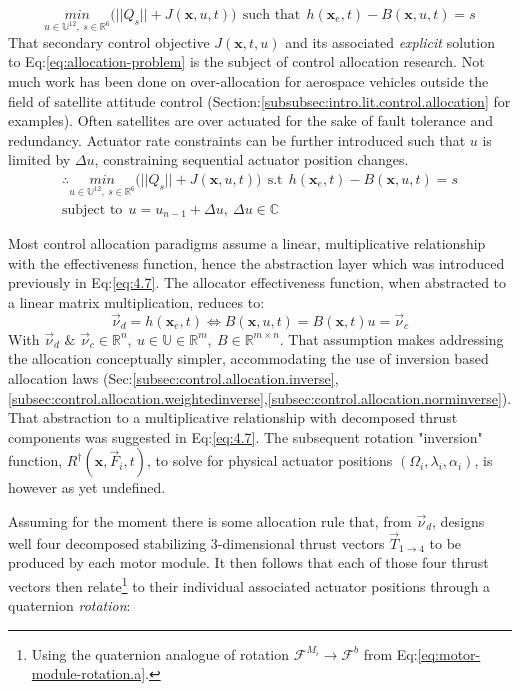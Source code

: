 \begin{equation}\label{eq:allocation-problem}
\underset{u\in\mathbb{U}^{12},~s\in\mathbb{R}^{6}}{min}\big(||Q_s||+J(\mathbf{x},u,t)\big)~~\text{such that}~~h(\mathbf{x}_e,t)-B(\mathbf{x},u,t)=s
\end{equation}
That secondary control objective $J(\mathbf{x},t,u)$ and its associated \emph{explicit} solution to Eq:\ref{eq:allocation-problem} is the subject of control allocation research. Not much work has been done on over-allocation for aerospace vehicles outside the field of satellite attitude control (Section:\ref{subsubsec:intro.lit.control.allocation} for examples). Often satellites are over actuated for the sake of fault tolerance and redundancy\cite{FTCallocation,discreteFTC}. Actuator rate constraints can be further introduced such that $u$ is limited by $\Delta u$, constraining sequential actuator position changes.
\begin{multline}
\therefore\underset{u\in\mathbb{U}^{12},~s\in\mathbb{R}^6}{min}\big(||Q_s||+J(\mathbf{x},u,t)\big)~~\text{s.t}~~h(\mathbf{x}_e,t)-B(\mathbf{x},u,t)=s\\\text{subject to}~~u=u_{n-1}+\Delta u,~\Delta u\in\mathbb{C}
\end{multline}
\par
Most control allocation paradigms assume a linear, multiplicative relationship with the effectiveness function, hence the abstraction layer which was introduced previously in Eq:\ref{eq:4.7}. The allocator effectiveness function, when abstracted to a linear matrix multiplication, reduces to:
\begin{equation}
\vec{\nu}_d=h(\mathbf{x}_e,t)\Longleftrightarrow B(\mathbf{x},u,t)=B(\mathbf{x},t)u=\vec{\nu}_c
\end{equation}
With $\vec{\nu}_d\text{~\&~}\vec{\nu}_c\in\mathbb{R}^n,~u\in\mathbb{U}\in\mathbb{R}^m,~B\in\mathbb{R}^{m\times n}$. That assumption makes addressing the allocation conceptually simpler, accommodating the use of inversion based allocation laws (Sec:\ref{subsec:control.allocation.inverse},\ref{subsec:control.allocation.weightedinverse},\ref{subsec:control.allocation.norminverse}). That abstraction to a multiplicative relationship with decomposed thrust components was suggested in Eq:\ref{eq:4.7}. The subsequent rotation "inversion" function, $R^\dagger(\mathbf{x},\vec{F}_i,t)$, to solve for physical actuator positions $(\Omega_i,\lambda_i,\alpha_i)$, is however as yet undefined.
\par
Assuming for the moment there is some allocation rule that, from $\vec{\nu}_d$, designs well four decomposed stabilizing 3-dimensional thrust vectors $\vec{T}_{1\rightarrow 4}$ to be produced by each motor module. It then follows that each of those four thrust vectors then relate\footnote{Using the quaternion analogue of rotation $\mathcal{F}^{M_i}\rightarrow\mathcal{F}^b$ from Eq:\ref{eq:motor-module-rotation.a}.} to their individual associated actuator positions through a quaternion \emph{rotation}:
